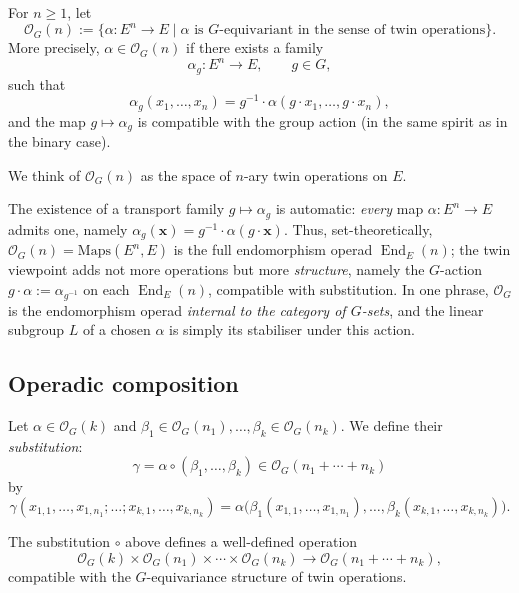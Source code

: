 \documentclass[11pt,a4paper]{article}
\numberwithin{equation}{section}
\DeclareMathOperator{\End}{End}
\newcommand{\LinearSubgroup}{L}
\begin{document}
	\begin{definition}
		For $n\ge 1$, let
		\[
		\mathcal{O}_G(n) := \{ \alpha : E^n\to E \mid \alpha \text{ is $G$-equivariant in the sense of twin operations} \}.
		\]
		More precisely, $\alpha\in\mathcal{O}_G(n)$ if there exists a family
		\[
		\alpha_g : E^n\to E,\qquad g\in G,
		\]
		such that
		\[
		\alpha_g(x_1,\dots,x_n) = g^{-1}\cdot \alpha(g\cdot x_1,\dots,g\cdot x_n),
		\]
		and the map $g\mapsto \alpha_g$ is compatible with the group action (in the same spirit as in the binary case).
	\end{definition}
	
	We think of $\mathcal{O}_G(n)$ as the space of $n$-ary twin operations on $E$.

	\begin{remark}\label{rem:OG-internal}
		The existence of a transport family $g\mapsto\alpha_g$ is automatic: \emph{every} map $\alpha:E^n\to E$
		admits one, namely $\alpha_g(\mathbf{x})=g^{-1}\cdot\alpha(g\cdot\mathbf{x})$. Thus, set-theoretically,
		$\mathcal{O}_G(n)=\mathrm{Maps}(E^n,E)$ is the full endomorphism operad $\End_E(n)$; the twin viewpoint adds
		not more operations but more \emph{structure}, namely the $G$-action $g\cdot\alpha:=\alpha_{g^{-1}}$ on each
		$\End_E(n)$, compatible with substitution. In one phrase, $\mathcal{O}_G$ is the endomorphism operad
		\emph{internal to the category of $G$-sets}, and the linear subgroup $\LinearSubgroup$ of a chosen $\alpha$
		is simply its stabiliser under this action.
	\end{remark}
	
	\subsection{Operadic composition}
	
	Let $\alpha\in\mathcal{O}_G(k)$ and $\beta_1\in\mathcal{O}_G(n_1),\dots,\beta_k\in\mathcal{O}_G(n_k)$.
	We define their \emph{substitution}:
	\[
	\gamma = \alpha\circ(\beta_1,\dots,\beta_k) \in \mathcal{O}_G(n_1+\cdots+n_k)
	\]
	by
	\[
	\gamma(x_{1,1},\dots,x_{1,n_1};\dots;x_{k,1},\dots,x_{k,n_k})
	= \alpha\big(\beta_1(x_{1,1},\dots,x_{1,n_1}),\dots,\beta_k(x_{k,1},\dots,x_{k,n_k})\big).
	\]
	
	\begin{proposition}
		The substitution $\circ$ above defines a well-defined operation
		\[
		\mathcal{O}_G(k)\times \mathcal{O}_G(n_1)\times\cdots\times\mathcal{O}_G(n_k)
		\to \mathcal{O}_G(n_1+\cdots+n_k),
		\]
		compatible with the $G$-equivariance structure of twin operations.
	\end{proposition}
	
\end{document}
